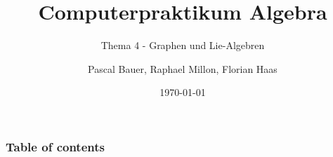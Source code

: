 \documentclass[9pt]{beamer}
\title{Computerpraktikum Algebra}
\subtitle{Thema 4 - Graphen und Lie-Algebren}
\author{Pascal Bauer, Raphael Millon, Florian Haas}
\institute{Sommersemester 2020}
\date{\today}
\begin{document}
\titlepage 

\begin{frame}
 \frametitle{Table of contents}
 \tableofcontents
\end{frame}
\end{document}
